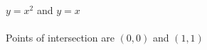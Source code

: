 {$y=x^2$ and $y=x$}
{\text{}\\ \label{fig:02_04_ex_19}\\
Points of intersection are $(0,0)$ and $(1,1)$}
